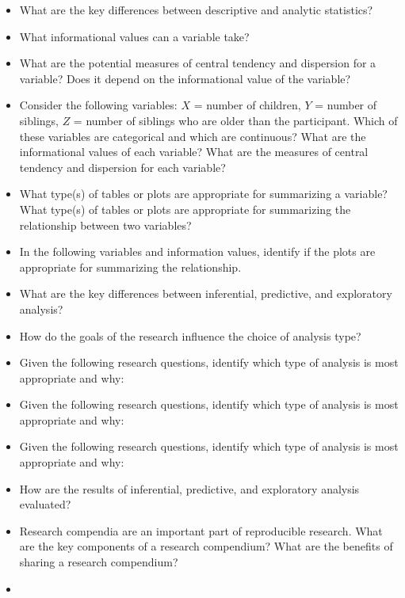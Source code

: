 \documentclass[
  letterpaper,
]{latex/krantz}
\providecommand{\tightlist}{%
  \setlength{\itemsep}{0pt}\setlength{\parskip}{0pt}}\usepackage{longtable,booktabs,array}
\begin{document}

\begin{tcolorbox}[enhanced jigsaw, colframe=quarto-callout-note-color-frame, titlerule=0mm, coltitle=black, colback=white, opacitybacktitle=0.6, colbacktitle=quarto-callout-note-color!10!white, left=2mm, arc=.35mm, leftrule=.75mm, rightrule=.15mm, bottomtitle=1mm, toptitle=1mm, breakable, bottomrule=.15mm, title=\textcolor{quarto-callout-note-color}{\faInfo}\hspace{0.5em}{Conceptual questions}, toprule=.15mm, opacityback=0]

\begin{itemize}
\tightlist
\item
  What are the key differences between descriptive and analytic
  statistics?
\item
  What informational values can a variable take?
\item
  What are the potential measures of central tendency and dispersion for
  a variable? Does it depend on the informational value of the variable?
\item
  Consider the following variables: \(X\) = number of children, \(Y\) =
  number of siblings, \(Z\) = number of siblings who are older than the
  participant. Which of these variables are categorical and which are
  continuous? What are the informational values of each variable? What
  are the measures of central tendency and dispersion for each variable?
\item
  What type(s) of tables or plots are appropriate for summarizing a
  variable? What type(s) of tables or plots are appropriate for
  summarizing the relationship between two variables?
\item
  In the following variables and information values, identify if the
  plots are appropriate for summarizing the relationship.
\item
  What are the key differences between inferential, predictive, and
  exploratory analysis?
\item
  How do the goals of the research influence the choice of analysis
  type?
\item
  Given the following research questions, identify which type of
  analysis is most appropriate and why:
\item
  Given the following research questions, identify which type of
  analysis is most appropriate and why:
\item
  Given the following research questions, identify which type of
  analysis is most appropriate and why:
\item
  How are the results of inferential, predictive, and exploratory
  analysis evaluated?
\item
  Research compendia are an important part of reproducible research.
  What are the key components of a research compendium? What are the
  benefits of sharing a research compendium?
\item
\end{itemize}

\end{tcolorbox}
\end{document}
